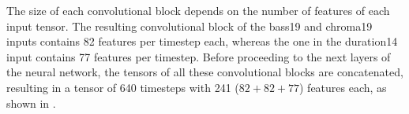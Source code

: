 
The size of each convolutional block depends on the number
of features of each input tensor. The resulting
convolutional block of the \gls{bass19} and \gls{chroma19}
inputs contains 82 features per timestep each, whereas the
one in the \gls{duration14} input contains 77 features per
timestep. Before proceeding to the next layers of the neural
network, the tensors of all these convolutional blocks are
concatenated, resulting in a tensor of 640 timesteps with
241 ($82+82+77$) features each, as shown in
.
